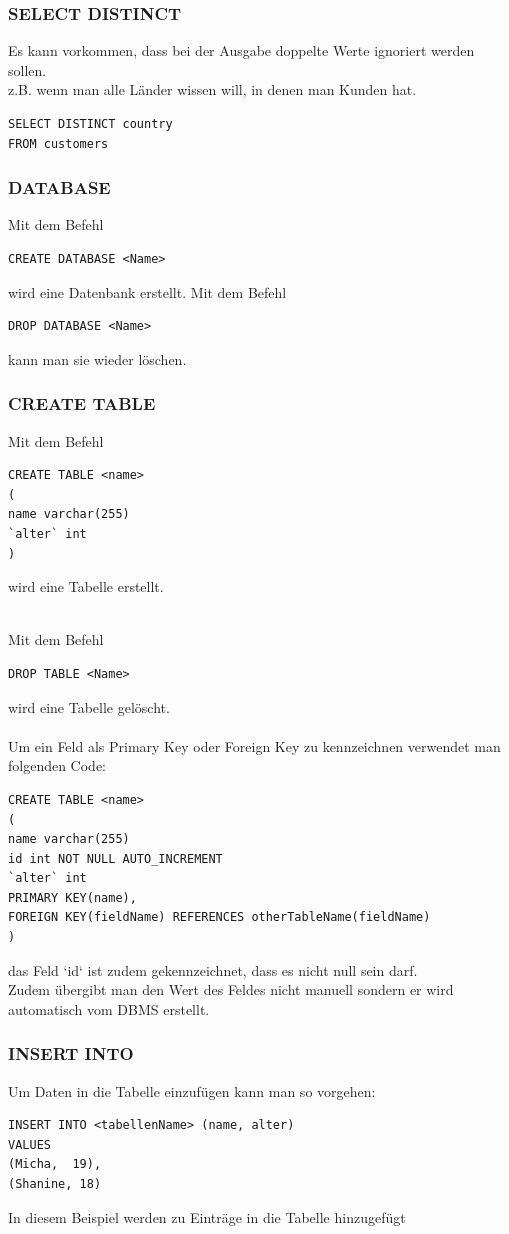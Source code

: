 \documentclass[10pt]{article}
\begin{document}
\subsubsection{SELECT DISTINCT}
Es kann vorkommen, dass bei der Ausgabe doppelte Werte ignoriert werden sollen. \\
z.B. wenn man  alle Länder wissen will, in denen man Kunden hat.
\begin{lstlisting}
SELECT DISTINCT country
FROM customers
\end{lstlisting}
\subsubsection{DATABASE}

Mit dem Befehl 
\begin{lstlisting}
CREATE DATABASE <Name>
\end{lstlisting}
wird eine Datenbank erstellt.
Mit dem Befehl
\begin{lstlisting}
DROP DATABASE <Name>
\end{lstlisting}
kann man sie wieder löschen.
\subsubsection{CREATE TABLE}

Mit dem Befehl 
\begin{lstlisting}
CREATE TABLE <name>
(
name varchar(255)
`alter` int
)
\end{lstlisting}
wird eine Tabelle erstellt. \\ \\

\break

Mit dem Befehl
\begin{lstlisting}
DROP TABLE <Name>
\end{lstlisting}
wird eine  Tabelle gelöscht. \\ \\
Um ein Feld als Primary Key oder Foreign Key zu kennzeichnen verwendet man folgenden Code:
\begin{lstlisting}
CREATE TABLE <name>
(
name varchar(255) 
id int NOT NULL AUTO_INCREMENT
`alter` int
PRIMARY KEY(name),
FOREIGN KEY(fieldName) REFERENCES otherTableName(fieldName)
)
\end{lstlisting}
das Feld `id` ist zudem gekennzeichnet, dass es nicht null sein darf. \\
Zudem übergibt man den Wert des Feldes nicht manuell sondern er wird automatisch vom DBMS erstellt.
\subsubsection{INSERT INTO}
Um Daten in die Tabelle einzufügen kann man so vorgehen:
\begin{lstlisting}
INSERT INTO <tabellenName> (name, alter)
VALUES
(Micha,  19),
(Shanine, 18)
\end{lstlisting}
In diesem Beispiel werden zu Einträge in die Tabelle hinzugefügt
\end{document}
